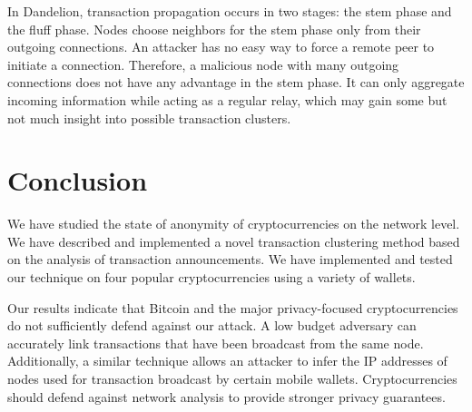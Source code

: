 In Dandelion, transaction propagation occurs in two stages: the stem phase and the fluff phase.
Nodes choose neighbors for the stem phase only from their outgoing connections.
An attacker has no easy way to force a remote peer to initiate a connection.
Therefore, a malicious node with many outgoing connections does not have any advantage in the stem phase.
It can only aggregate incoming information while acting as a regular relay, which may gain some but not much insight into possible transaction clusters.


\section{Conclusion} \label{sec:Ch03Conclusion}

We have studied the state of anonymity of cryptocurrencies on the network level.
We have described and implemented a novel transaction clustering method based on the analysis of transaction announcements.
We have implemented and tested our technique on four popular cryptocurrencies using a variety of wallets.

Our results indicate that Bitcoin and the major privacy-focused cryptocurrencies do not sufficiently defend against our attack.
A low budget adversary can accurately link transactions that have been broadcast from the same node.
Additionally, a similar technique allows an attacker to infer the IP addresses of nodes used for transaction broadcast by certain mobile wallets.
Cryptocurrencies should defend against network analysis to provide stronger privacy guarantees.

